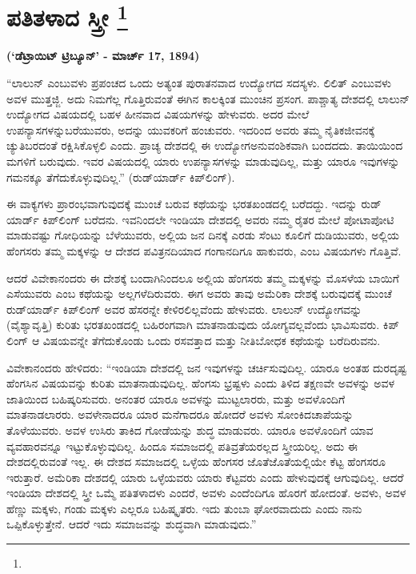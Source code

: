 
\chapter[ಪತಿತಳಾದ ಸ್ತ್ರೀ ]{ಪತಿತಳಾದ ಸ್ತ್ರೀ \protect\footnote{}}

\centerline{\textbf{(‘ಡೆಟ್ರಾಯಿಟ್​ ಟ್ರಿಬ್ಯೂನ್​’ - ಮಾರ್ಚ್​ 17, 1894)}}

\vskip 3pt

“ಲಾಲುನ್​ ಎಂಬುವಳು ಪ್ರಪಂಚದ ಒಂದು ಅತ್ಯಂತ ಪುರಾತನವಾದ ಉದ್ಯೋಗದ ಸದಸ್ಯಳು. ಲಿಲಿತ್​ ಎಂಬುವಳು ಅವಳ ಮುತ್ತಜ್ಜಿ. ಅದು ನಿಮಗೆಲ್ಲ ಗೊತ್ತಿರುವಂತೆ ಈಗಿನ ಕಾಲಕ್ಕಿಂತ ಮುಂಚಿನ ಪ್ರಸಂಗ. ಪಾಶ್ಚಾತ್ಯ ದೇಶದಲ್ಲಿ ಲಾಲುನ್​ ಉದ್ಯೋಗದ ವಿಷಯದಲ್ಲಿ ಬಹಳ ಹೀನವಾದ ವಿಷಯಗಳನ್ನು ಹೇಳುವರು. ಅದರ ಮೇಲೆ ಉಪನ್ಯಾಸಗಳನ್ನು\break ಬರೆಯುವರು, ಅದನ್ನು ಯುವಕರಿಗೆ ಹಂಚುವರು. ಇದರಿಂದ ಅವರು ತಮ್ಮ ನೈತಿಕ\break ಜೀವನಕ್ಕೆ ಚ್ಯುತಿಬರದಂತೆ ರಕ್ಷಿಸಿಕೊಳ್ಳಲಿ ಎಂದು. ಪ್ರಾಚ್ಯ ದೇಶದಲ್ಲಿ ಈ ಉದ್ಯೋಗ\break ಅನುವಂಶಿಕವಾಗಿ ಬಂದದದು. ತಾಯಿಯಿಂದ ಮಗಳಿಗೆ ಬರುವುದು. ಇವರ ವಿಷಯದಲ್ಲಿ ಯಾರು ಉಪನ್ಯಾಸಗಳನ್ನು ಮಾಡುವುದಿಲ್ಲ, ಮತ್ತು ಯಾರೂ ಇವುಗಳನ್ನು ಗಮನಕ್ಕೂ ತೆಗೆದುಕೊಳ್ಳುವುದಿಲ್ಲ.” (ರುಡ್​ಯಾರ್ಡ್​ ಕಿಪ್​ಲಿಂಗ್​).

\vskip 3pt

ಈ ವಾಕ್ಯಗಳು ಪ್ರಾರಂಭವಾಗುವುದಕ್ಕೆ ಮುಂಚೆ ಬರುವ ಕಥೆಯನ್ನು ಭರತಖಂಡದಲ್ಲಿ ಬರೆದದ್ದು. ಇದನ್ನು ರುಡ್​ಯಾರ್ಡ್​ ಕಿಪ್​ಲಿಂಗ್​ ಬರೆದನು. ಇವನಿಂದಲೇ ಇಂಡಿಯಾ ದೇಶದಲ್ಲಿ ಅವರು ನಮ್ಮ ರೈತರ ಮೇಲೆ ಪೋಟಾಪೋಟಿ ಮಾಡುವಷ್ಟು ಗೋಧಿಯನ್ನು ಬೆಳೆಯುವರು, ಅಲ್ಲಿಯ ಜನ ದಿನಕ್ಕೆ ಎರಡು ಸೆಂಟು ಕೂಲಿಗೆ ದುಡಿಯುವರು, ಅಲ್ಲಿಯ ಹೆಂಗಸರು ತಮ್ಮ ಮಕ್ಕಳನ್ನು ಆ ದೇಶದ ಪವಿತ್ರನದಿಯಾದ ಗಂಗಾನದಿಗೂ ಹಾಕುವರು, ಎಂಬ ವಿಷಯಗಳು ಗೊತ್ತಿವೆ.

\vskip 3pt

ಆದರೆ ವಿವೇಕಾನಂದರು ಈ ದೇಶಕ್ಕೆ ಬಂದಾಗಿನಿಂದಲೂ ಅಲ್ಲಿಯ ಹೆಂಗಸರು ತಮ್ಮ ಮಕ್ಕಳನ್ನು ಮೊಸಳೆಯ ಬಾಯಿಗೆ ಎಸೆಯುವರು ಎಂಬ ಕಥೆಯನ್ನು ಅಲ್ಲಗಳೆದಿರುವರು. ಈಗ ಅವರು ತಾವು ಅಮೆರಿಕಾ ದೇಶಕ್ಕೆ ಬರುವುದಕ್ಕೆ ಮುಂಚೆ ರುಡ್​ಯಾರ್ಡ್​ ಕಿಪ್​ಲಿಂಗ್​ ಅವರ ಹೆಸರನ್ನೇ ಕೇಳಿರಲಿಲ್ಲವೆಂದು ಹೇಳುವರು. ಲಾಲುನ್​ ಉದ್ಯೋಗವನ್ನು (ವೈಶ್ಯಾವೃತ್ತಿ) ಕುರಿತು ಭರತಖಂಡದಲ್ಲಿ ಬಹಿರಂಗವಾಗಿ ಮಾತನಾಡುವುದು ಯೋಗ್ಯವಲ್ಲವೆಂದು ಭಾವಿಸುವರು. ಕಿಪ್​ಲಿಂಗ್​ ಆ ವಿಷಯವನ್ನೇ ತೆಗೆದುಕೊಂಡು ಒಂದು ರಸವತ್ತಾದ ಮತ್ತು ನೀತಿಬೋಧಕ ಕಥೆಯನ್ನು ಬರೆದಿರುವನು.

\vskip 3pt

ವಿವೇಕಾನಂದರು ಹೇಳಿದರು: “ಇಂಡಿಯಾ ದೇಶದಲ್ಲಿ ಜನ ಇವುಗಳನ್ನು ಚರ್ಚಿಸುವುದಿಲ್ಲ. ಯಾರೂ ಅಂತಹ ದುರದೃಷ್ಟ ಹೆಂಗಸಿನ ವಿಷಯವನ್ನು ಕುರಿತು ಮಾತನಾಡುವುದಿಲ್ಲ. ಹೆಂಗಸು ಭ್ರಷ್ಟಳು ಎಂದು ತಿಳಿದ ತಕ್ಷಣವೇ ಅವಳನ್ನು ಅವಳ ಜಾತಿಯಿಂದ ಬಹಿಷ್ಕರಿಸುವರು. ಅನಂತರ ಯಾರೂ ಅವಳನ್ನು ಮುಟ್ಟಲಾರರು, ಮತ್ತು ಅವಳೊಂದಿಗೆ ಮಾತನಾಡಲಾರರು. ಅವಳೇನಾದರೂ ಯಾರ ಮನೆಗಾದರೂ ಹೋದರೆ ಅವಳು ಸೋಂಕಿದ\break ಚಾಪೆಯನ್ನು ತೊಳೆಯುವರು. ಅವಳ ಉಸಿರು ತಾಕಿದ ಗೋಡೆಯನ್ನು ಶುದ್ಧ ಮಾಡುವರು. ಯಾರೂ ಅವಳೊಂದಿಗೆ ಯಾವ ವ್ಯವಹಾರವನ್ನೂ ಇಟ್ಟುಕೊಳ್ಳುವುದಿಲ್ಲ. ಹಿಂದೂ ಸಮಾಜದಲ್ಲಿ ಪತಿವ್ರತೆಯರಲ್ಲದ ಸ್ತ್ರೀಯರಿಲ್ಲ. ಅದು ಈ ದೇಶದಲ್ಲಿರುವಂತೆ ಇಲ್ಲ. ಈ ದೇಶದ ಸಮಾಜದಲ್ಲಿ ಒಳ್ಳೆಯ ಹೆಂಗಸರ ಜೊತೆಜೊತೆಯಲ್ಲಿಯೇ ಕೆಟ್ಟ ಹೆಂಗಸರೂ ಇರುತ್ತಾರೆ. ಅಮೆರಿಕಾ ದೇಶದಲ್ಲಿ ಯಾರು ಒಳ್ಳೆಯವರು ಯಾರು ಕೆಟ್ಟವರು ಎಂದು ಹೇಳುವುದಕ್ಕೆ ಆಗುವುದಿಲ್ಲ. ಆದರೆ ಇಂಡಿಯಾ ದೇಶದಲ್ಲಿ ಸ್ತ್ರೀ ಒಮ್ಮೆ ಪತಿತಳಾದಳು ಎಂದರೆ, ಅವಳು ಎಂದೆಂದಿಗೂ ಹೊರಗೆ ಹೋದಂತೆ. ಅವಳು, ಅವಳ ಹೆಣ್ಣು ಮಕ್ಕಳು, ಗಂಡು ಮಕ್ಕಳು ಎಲ್ಲರೂ ಬಹಿಷ್ಕೃತರು. ಇದು ತುಂಬಾ ಘೋರವಾದುದು ಎಂದು ನಾನು ಒಪ್ಪಿಕೊಳ್ಳುತ್ತೇನೆ. ಆದರೆ ಇದು ಸಮಾಜವನ್ನು ಶುದ್ಧವಾಗಿ ಮಾಡುವುದು.”

